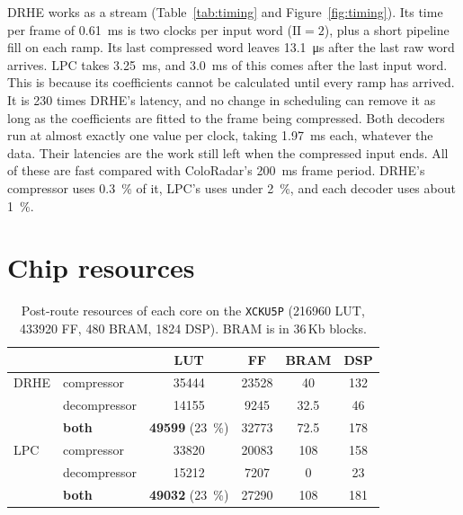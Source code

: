 DRHE works as a stream (Table~\ref{tab:timing} and Figure~\ref{fig:timing}).
Its time per frame of \SI{0.61}{\milli\second} is two clocks per input word
($\mathrm{II} = 2$), plus a short pipeline fill on each ramp. Its last
compressed word leaves \SI{13.1}{\micro\second} after the last raw word
arrives. LPC takes \SI{3.25}{\milli\second}, and \SI{3.0}{\milli\second} of
this comes after the last input word. This is because its coefficients cannot
be calculated until every ramp has arrived. It is 230 times DRHE's latency, and
no change in scheduling can remove it as long as the coefficients are fitted to
the frame being compressed. Both decoders run at almost exactly one value per
clock, taking \SI{1.97}{\milli\second} each, whatever the data. Their
latencies are the work still left when the compressed input ends. All of these
are fast compared with ColoRadar's \SI{200}{\milli\second} frame period.
DRHE's compressor uses \SI{0.3}{\percent} of it, LPC's uses under
\SI{2}{\percent}, and each decoder uses about \SI{1}{\percent}.

\section{Chip resources}
\label{sec:resources}

\begin{table}[htbp]
\centering
\caption[Resources per core]{Post-route resources of each core on the
\texttt{XCKU5P} (\num{216960} LUT, \num{433920} FF, 480 BRAM, \num{1824} DSP).
BRAM is in 36\,Kb blocks.}
\label{tab:resources}
\small
\begin{tabular}{l|l|c|c|c|c}
& & \textbf{LUT} & \textbf{FF} & \textbf{BRAM} & \textbf{DSP}\\
\hline
DRHE & compressor   & \num{35444} & \num{23528} & 40   & 132\\
     & decompressor & \num{14155} & \num{9245}  & 32.5 & 46\\
     & \textbf{both} & \textbf{\num{49599}} (\SI{23}{\percent}) & \num{32773} & 72.5 & 178\\
\hline
LPC  & compressor   & \num{33820} & \num{20083} & 108  & 158\\
     & decompressor & \num{15212} & \num{7207}  & 0    & 23\\
     & \textbf{both} & \textbf{\num{49032}} (\SI{23}{\percent}) & \num{27290} & 108 & 181\\
\end{tabular}
\end{table}

